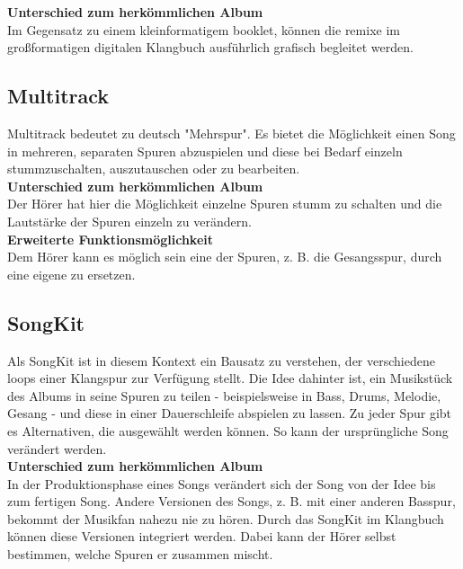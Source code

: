 \textbf{Unterschied zum herkömmlichen Album}\\
Im Gegensatz zu einem kleinformatigem \gls{booklet}, können die \gls{remix}e im großformatigen digitalen Klangbuch ausführlich grafisch begleitet werden.




\subsection{Multitrack}
Multitrack bedeutet zu deutsch "Mehrspur". Es bietet die Möglichkeit einen Song in mehreren, separaten Spuren abzuspielen und diese bei Bedarf einzeln stummzuschalten, auszutauschen oder zu bearbeiten.\\

\textbf{Unterschied zum herkömmlichen Album}\\
Der Hörer hat hier die Möglichkeit einzelne Spuren stumm zu schalten und die Lautstärke der Spuren einzeln zu verändern.\\

\textbf{Erweiterte Funktionsmöglichkeit}\\
Dem Hörer kann es möglich sein eine der Spuren, z. B. die Gesangsspur, durch eine eigene zu ersetzen.




\subsection{SongKit}
Als SongKit ist in diesem Kontext ein Bausatz zu verstehen, der verschiedene \gls{loop}s einer Klangspur zur Verfügung stellt. Die Idee dahinter ist, ein Musikstück des Albums in seine Spuren zu teilen - beispielsweise in Bass, Drums, Melodie, Gesang - und diese in einer Dauerschleife abspielen zu lassen. Zu jeder Spur gibt es Alternativen, die ausgewählt werden können. So kann der ursprüngliche Song verändert werden.\\


\textbf{Unterschied zum herkömmlichen Album}\\
In der Produktionsphase eines Songs verändert sich der Song von der Idee bis zum fertigen Song. Andere Versionen des Songs, z. B. mit einer anderen Basspur, bekommt der Musikfan nahezu nie zu hören. Durch das SongKit im Klangbuch können diese Versionen integriert werden. Dabei kann der Hörer selbst bestimmen, welche Spuren er zusammen mischt.\\


